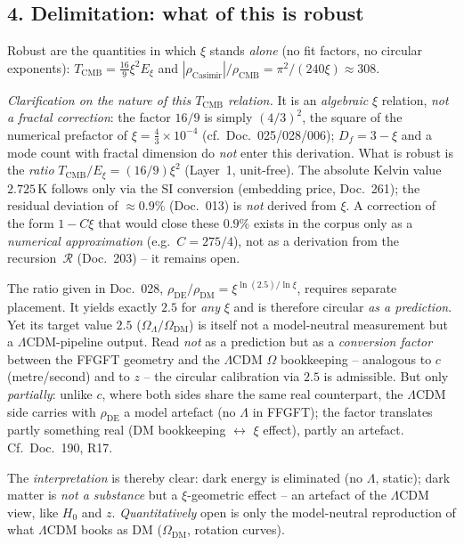\subsection*{4. Delimitation: what of this is robust}

Robust are the quantities in which $\xi$ stands \emph{alone} (no fit factors,
no circular exponents): $T_{\text{CMB}}=\tfrac{16}{9}\xi^2 E_\xi$ and
$|\rho_{\text{Casimir}}|/\rho_{\text{CMB}}=\pi^2/(240\xi)\approx308$.

\emph{Clarification on the nature of this $T_{\text{CMB}}$ relation.} It is an
\emph{algebraic} $\xi$ relation, \emph{not a fractal correction}: the factor
$16/9$ is simply $(4/3)^2$, the square of the numerical prefactor of
$\xi = \tfrac{4}{3}\times10^{-4}$ (cf.\ Doc.~025/028/006); $D_f = 3-\xi$ and a
mode count with fractal dimension do \emph{not} enter this derivation. What is
robust is the \emph{ratio} $T_{\text{CMB}}/E_\xi = (16/9)\xi^2$ (Layer~1,
unit-free). The absolute Kelvin value $2.725$\,K follows only via the SI
conversion (embedding price, Doc.~261); the residual deviation of
$\approx 0.9\%$ (Doc.~013) is \emph{not} derived from $\xi$. A correction of the
form $1-C\xi$ that would close these $0.9\%$ exists in the corpus only as a
\emph{numerical approximation} (e.g.\ $C=275/4$), not as a derivation from the
recursion~$\mathcal{R}$ (Doc.~203) -- it remains open.

The ratio given in Doc.~028,
$\rho_{\text{DE}}/\rho_{\text{DM}}=\xi^{\ln(2.5)/\ln\xi}$, requires separate
placement. It yields exactly $2.5$ for \emph{any} $\xi$ and is therefore
circular \emph{as a prediction}. Yet its target value $2.5$
($\Omega_\Lambda/\Omega_{\text{DM}}$) is itself not a model-neutral measurement
but a $\Lambda$CDM-pipeline output. Read \emph{not} as a prediction but as a
\emph{conversion factor} between the FFGFT geometry and the $\Lambda$CDM
$\Omega$ bookkeeping -- analogous to $c$ (metre/second) and to $z$ -- the
circular calibration via $2.5$ is admissible. But only \emph{partially}: unlike
$c$, where both sides share the same real counterpart, the $\Lambda$CDM side
carries with $\rho_{\text{DE}}$ a model artefact (no $\Lambda$ in FFGFT); the
factor translates partly something real (DM bookkeeping $\leftrightarrow$ $\xi$
effect), partly an artefact. Cf.\ Doc.~190, R17.

The \emph{interpretation} is thereby clear: dark energy is eliminated (no
$\Lambda$, static); dark matter is \emph{not a substance} but a $\xi$-geometric
effect -- an artefact of the $\Lambda$CDM view, like $H_0$ and $z$.
\emph{Quantitatively} open is only the model-neutral reproduction of what
$\Lambda$CDM books as DM ($\Omega_{\text{DM}}$, rotation curves).

